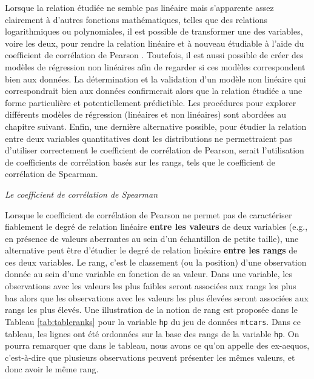 \documentclass[
  french,
]{book}
\begin{document}
Lorsque la relation étudiée ne semble pas linéaire mais s'apparente assez clairement à d'autres fonctions mathématiques, telles que des relations logarithmiques ou polynomiales, il est possible de transformer une des variables, voire les deux, pour rendre la relation linéaire et à nouveau étudiable à l'aide du coefficient de corrélation de Pearson \autocite{halperinSpuriousCorrelationsCauses1986}. Toutefois, il est aussi possible de créer des modèles de régression non linéaires afin de regarder si ces modèles correspondent bien aux données. La détermination et la validation d'un modèle non linéaire qui correspondrait bien aux données confirmerait alors que la relation étudiée a une forme particulière et potentiellement prédictible. Les procédures pour explorer différents modèles de régression (linéaires et non linéaires) sont abordées au chapitre suivant. Enfin, une dernière alternative possible, pour étudier la relation entre deux variables quantitatives dont les distributions ne permettraient pas d'utiliser correctement le coefficient de corrélation de Pearson, serait l'utilisation de coefficients de corrélation basés sur les rangs, tels que le coefficient de corrélation de Spearman.

\emph{Le coefficient de corrélation de Spearman}

Lorsque le coefficient de corrélation de Pearson ne permet pas de caractériser fiablement le degré de relation linéaire \textbf{entre les valeurs} de deux variables (e.g., en présence de valeurs aberrantes au sein d'un échantillon de petite taille), une alternative peut être d'étudier le degré de relation linéaire \textbf{entre les rangs} de ces deux variables. Le rang, c'est le classement (ou la position) d'une observation donnée au sein d'une variable en fonction de sa valeur. Dans une variable, les observations avec les valeurs les plus faibles seront associées aux rangs les plus bas alors que les observations avec les valeurs les plus élevées seront associées aux rangs les plus élevés. Une illustration de la notion de rang est proposée dans le Tableau \ref{tab:tableranks} pour la variable \texttt{hp} du jeu de données \texttt{mtcars}. Dans ce tableau, les lignes ont été ordonnées sur la base des rangs de la variable \texttt{hp}. On pourra remarquer que dans le tableau, nous avons ce qu'on appelle des ex-aequos, c'est-à-dire que plusieurs observations peuvent présenter les mêmes valeurs, et donc avoir le même rang.

\providecommand{\docline}[3]{\noalign{\global\setlength{\arrayrulewidth}{#1}}\arrayrulecolor[HTML]{#2}\cline{#3}}
\end{document}
